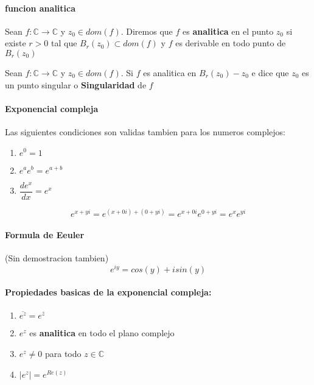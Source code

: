 \documentclass[10pt]{article}
\begin{document}
\paragraph{funcion analitica}Sean $f: \mathbb{C} \rightarrow \mathbb{C}$ y $z_0 \in dom(f)$. Diremos que $f$ es \textbf{analitica} en el punto $z_0$ si existe $r > 0$ tal que $B_r(z_0) \subset dom(f)$ y $f$ es derivable en todo punto de $B_r(z_0)$\\
\linebreak

Sean $f: \mathbb{C} \rightarrow \mathbb{C}$ y $z_0 \in dom(f)$. Si $f$ es analitica en $B_r(z_0) - {z_0}$ e dice que $z_0$ es un punto singular o \textbf{Singularidad} de $f$

\paragraph{Exponencial compleja}
Las siguientes condiciones son validas tambien para los numeros complejos:
\begin{enumerate}
	\item $e^0 = 1$
	\item $e^a e^b = e^{a+b} $
	\item $\dfrac{de^x}{dx} = e^x$
\end{enumerate}

\begin{equation*}
	e^{x+yi} = e^{(x+0i)+(0+yi)} = e^{x+0i}e^{0+yi} = e^{x}e^{yi}
\end{equation*}

\paragraph{Formula de Eeuler} (Sin demostracion tambien)
\begin{equation*}
	e^{iy} = cos(y)+isin(y)
\end{equation*}

\paragraph{Propiedades basicas de la exponencial compleja:}

\begin{enumerate}
	\item $\overline{e^z} =e^{\overline{z}}$
	\item $e^z$ es \textbf{analitica} en todo el plano complejo
	\item $e^z \neq 0$ para todo $z \in \mathbb{C}$
	\item $|e^z| = e^{Re(z)}$
\end{enumerate}
\end{document}
